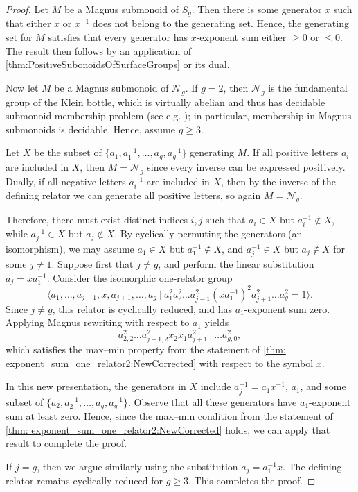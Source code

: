 \documentclass[11pt]{amsart}
\newcommand{\Gpres}[2]{\bigl\langle #1\:|\:#2 \bigr\rangle}
\theoremstyle{plain}
\theoremstyle{definition}
\begin{document}
\begin{proof}
Let $M$ be a Magnus submonoid of $S_g$. Then there is some generator $x$ such that either $x$ or $x^{-1}$ does not belong to the generating set. Hence, the generating set for $M$ satisfies that every generator has $x$-exponent sum either $\geq 0$ or $\leq 0$. The result then follows by an application of \cref{thm:PositiveSubonoidsOfSurfaceGroups} or its dual.
  

Now let $M$ be a Magnus submonoid of $\mathcal{N}_g$. If $g=2$, then $\mathcal{N}_g$ is the fundamental group of the Klein bottle, which is virtually abelian and thus has decidable 
submonoid membership problem (see e.g. \cite{lohrey2015rational}); 
in particular, membership in Magnus submonoids is decidable. Hence, assume $g \geq 3$.


Let $X$ be the subset of $\{ a_1, a_1^{-1}, \ldots, a_g, a_g^{-1} \}$ generating $M$. If all positive letters $a_i$ are included in $X$, then $M = \mathcal{N}_g$ since every inverse can be expressed positively. Dually, if all negative letters $a_i^{-1}$ are included in $X$, then by the inverse of the defining relator we can generate all positive letters, so again $M = \mathcal{N}_g$. 

Therefore, there must exist distinct indices $i, j$ such that $a_i \in X$ but $a_i^{-1} \notin X$, while $a_j^{-1} \in X$ but $a_j \notin X$. By cyclically permuting the generators (an isomorphism), we may assume $a_1 \in X$ but $a_1^{-1} \notin X$, and $a_j^{-1} \in X$ but $a_j \notin X$ for some $j \neq 1$. Suppose first that $j \neq g$, and perform the linear substitution $a_j = x a_1^{-1}$. Consider the isomorphic one-relator group
\[
\Gpres{
a_1, \ldots, a_{j-1}, x, a_{j+1}, \ldots, a_g
}{
a_1^2 a_2^2 \ldots a_{j-1}^2 (x a_1^{-1})^2 a_{j+1}^2 \ldots a_g^2 = 1
}.
\]
Since $j \neq g$, this relator is cyclically reduced, and has $a_1$-exponent sum zero. Applying Magnus rewriting with respect to $a_1$ yields
\[
a_{2,2}^2 \ldots a_{j-1,2}^2 x_2 x_1 a_{j+1,0}^2 \ldots a_{g,0}^2,
\]
which satisfies the max–min property from the statement of \cref{thm: exponent_sum_one_relator2:NewCorrected} with respect to the symbol $x$.

In this new presentation, the generators in $X$ include $a_j^{-1} = a_1 x^{-1}$, $a_1$, and some subset of $\{ a_2, a_2^{-1}, \ldots, a_g, a_g^{-1} \}$. Observe that all these generators have $a_1$-exponent sum at least zero. Hence, since the max–min condition
from the statement of \cref{thm: exponent_sum_one_relator2:NewCorrected} holds, we can apply that result to complete the proof.

If $j = g$, then we argue similarly using the substitution $a_j = a_1^{-1} x$. The defining relator remains cyclically reduced for $g \geq 3$. This completes the proof.
\end{proof}
\end{document}
